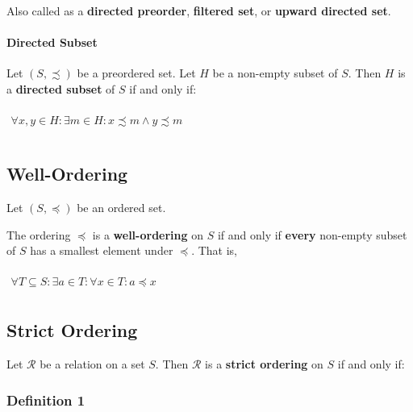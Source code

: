 Also called as a \textbf{directed preorder}, \textbf{filtered set}, or
\textbf{upward directed set}.

\paragraph{Directed Subset}
\label{sec:directed-subset}

Let $(S, \precsim)$ be a preordered set. Let $H$ be a non-empty subset
of $S$. Then $H$ is a \textbf{directed subset} of $S$ if and only if:

\begin{math}
  \begin{array}{c}
    \\
    \forall x, y \in H: \exists m \in H: x \precsim m \land y \precsim m\\
    \\
  \end{array}
\end{math}



\subsection{Well-Ordering}
\label{sec:well-ordering}

Let $(S, \preceq)$ be an ordered set.

The ordering $\preceq$ is a \textbf{well-ordering} on $S$ if and only
if \textbf{every} non-empty subset of $S$ has a smallest element under
$\preceq$. That is,


\begin{math}
  \begin{array}{c}
    \\
    \forall T \subseteq S: \exists a \in T : \forall x \in T : a \preceq x
    \\
  \end{array}
\end{math}

\subsection{Strict Ordering}
\label{sec:strict-ordering}

Let $\mathcal{R}$ be a relation on a set $S$. Then $\mathcal{R}$ is a
\textbf{strict ordering} on $S$ if and only if:

\subsubsection{Definition 1}

